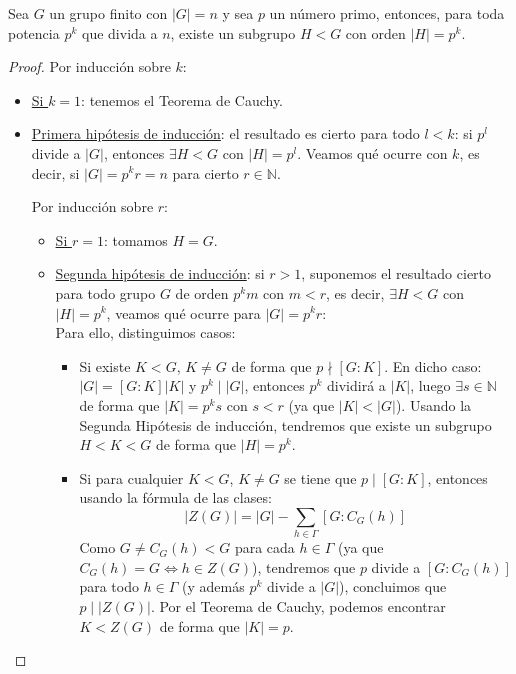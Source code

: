 \begin{teo}\label{teo:subgrupo_potencia_p}
    Sea $G$ un grupo finito con $|G| = n$ y sea $p$ un número primo, entonces, para toda potencia $p^k$ que divida a $n$, existe un subgrupo $H<G$ con orden $|H| = p^k$.
    \begin{proof}
        Por inducción sobre $k$:
        \begin{itemize}
            \item \underline{Si $k = 1$}: tenemos el Teorema de Cauchy.
            \item \underline{Primera hipótesis de inducción}: el resultado es cierto para todo $l<k$: si $p^l$ divide a $|G|$, entonces $\exists H<G$ con $|H| = p^l$. \newline Veamos qué ocurre con $k$, es decir, si ${|G| = p^kr = n}$ para cierto $r\in \mathbb{N}$.

                Por inducción sobre $r$:
                \begin{itemize}
                    \item \underline{Si $r=1$}: tomamos $H = G$.
                    \item \underline{Segunda hipótesis de inducción}: si $r>1$, suponemos el resultado cierto para todo grupo $G$ de orden $p^k m$ con $m<r$, es decir, $\exists H<G$ con $|H| = p^k$, veamos qué ocurre para $|G| = p^kr$:\\

                        Para ello, distinguimos casos:
                        \begin{itemize}
                            \item Si existe $K<G$, $K \neq G$ de forma que $p\nmid [G:K]$. En dicho caso: $|G| = [G:K]|K|$ y $p^k \mid |G|$, entonces $p^k$ dividirá a $|K|$, luego $\exists s \in \mathbb{N}$ de forma que $|K| = p^k s$ con $s<r$ (ya que $|K| < |G|$). Usando la Segunda Hipótesis de inducción, tendremos que existe un subgrupo $H<K<G$ de forma que $|H| = p^k$.
                            \item Si para cualquier $K<G$, $K\neq G$ se tiene que $p\mid [G:K]$, entonces usando la fórmula de las clases:
                                \begin{equation*}
                                    |Z(G)| = |G| - \sum_{h\in \Gamma} [G:C_G(h)]
                                \end{equation*}
                                Como $G\neq C_G(h) < G$ para cada $h\in \Gamma$ (ya que $C_G(h) = G \Longleftrightarrow h\in Z(G)$), tendremos que $p$ divide a $[G:C_G(h)]$ para todo $h\in \Gamma$ (y además $p^k$ divide a $|G|$), concluimos que $p \mid |Z(G)|$. Por el Teorema de Cauchy, podemos encontrar $K<Z(G)$ de forma que $|K| = p$.


\end{itemize}
\end{itemize}
\end{itemize}
\end{proof}
\end{teo}
